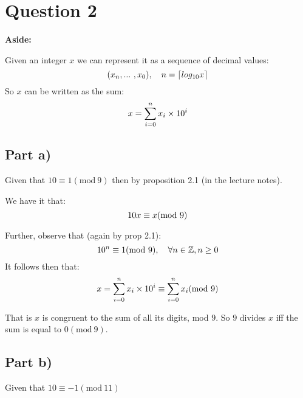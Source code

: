 \documentclass{article}
\numberwithin{equation}{subsection}
\begin{document}
	\newpage
	\thispagestyle{fancy}

	\section*{Question 2}

	\begin{adjustwidth}{2em}{1em}
		\textbf{Aside:}

		Given an integer $x$ we can represent it as a sequence of decimal values:
		\begin{equation}\notag
			(x_n, ...\ ,x_0), \quad n = \lceil log_{10}x \rceil
		\end{equation}
		So $x$ can be written as the sum:
		\begin{equation}\notag
			x = \sum_{i=0}^n x_i \times 10^i
		\end{equation}
	\end{adjustwidth}

	\vspace{10pt}
	\subsection*{Part a)}
	Given that $10 \equiv 1 (\textrm{mod}\ 9)$ then by proposition 2.1 (in the lecture notes). 

	We have it that:
	\begin{equation}\notag
		10x \equiv x (\textrm{mod}\ 9)
	\end{equation}

	Further, observe that (again by prop 2.1):
	\begin{equation}\notag
		10^n \equiv 1 (\textrm{mod}\ 9), \quad \forall n \in \mathbb{Z}, n\ge 0	
	\end{equation}
	It follows then that:
	\begin{equation}\notag
		x = \sum_{i=0}^n x_i \times 10^i \equiv \sum_{i=0}^n x_i (\textrm{mod}\ 9)
	\end{equation}

	That is $x$ is congruent to the sum of all its digits, mod $9$. So $9$ divides $x$
	iff the sum is equal to $0 (\textrm{mod}\ 9)$.

	\vspace{20pt}
	\subsection*{Part b)}
	Given that $10 \equiv -1 (\textrm{mod}\ 11)$ 
	
\end{document}
